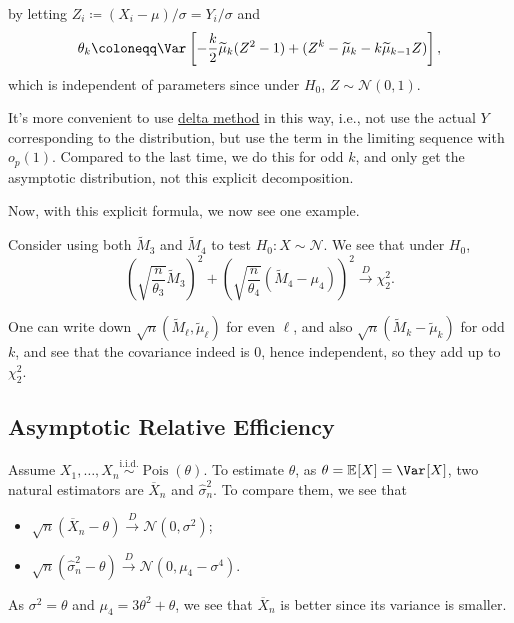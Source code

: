 by letting \(Z_i \coloneqq (X_i - \mu) / \sigma = Y_i / \sigma \) and
\[
	\theta _k
	\coloneqq \Var_{}\left[-\frac{k}{2} \widetilde{\mu} _k (Z^2 - 1) + (Z^k - \widetilde{\mu} _k - k \widetilde{\mu} _{k-1} Z ) \right],
\]
which is independent of parameters since under \(H_0\), \(Z \sim \mathcal{N} (0, 1)\).

\begin{note}
	It's more convenient to use \hyperref[thm:delta-method]{delta method} in this way, i.e., not use the actual \(Y\) corresponding to the distribution, but use the term in the limiting sequence with \(o_p(1)\). Compared to the last time, we do this for odd \(k\), and only get the asymptotic distribution, not this explicit decomposition.
\end{note}

Now, with this explicit formula, we now see one example.

\begin{eg}
	Consider using both \(\widetilde{M} _3\) and \(\widetilde{M} _4\) to test \(H_0\colon X \sim \mathcal{N} \). We see that under \(H_0\),
	\[
		\left( \sqrt{\frac{n}{\theta _3}} \widetilde{M} _3 \right) ^2 + \left( \sqrt{\frac{n}{\theta _4}} (\widetilde{M} _4 - \mu _4) \right) ^2
		\overset{D}{\to} \chi _2^2 .
	\]
\end{eg}
\begin{explanation}
	One can write down \(\sqrt{n} (\widetilde{M} _\ell , \widetilde{\mu} _\ell )\) for even \(\ell \), and also \(\sqrt{n} (\widetilde{M} _k - \widetilde{\mu} _k)\) for odd \(k\), and see that the covariance indeed is \(0\), hence independent, so they add up to \(\chi _2^2\).
\end{explanation}

\subsection{Asymptotic Relative Efficiency}
Assume \(X_1, \dots , X_n \overset{\text{i.i.d.} }{\sim } \operatorname{Pois}(\theta ) \). To estimate \(\theta \), as \(\theta = \mathbb{E}_{}[X] = \Var_{}[X] \), two natural estimators are \(\overline{X} _n\) and \(\hat{\sigma} _n^2\). To compare them, we see that
\begin{itemize}
	\item \(\sqrt{n} (\overline{X} _n - \theta ) \overset{D}{\to} \mathcal{N} (0, \sigma ^2)\);
	\item \(\sqrt{n} (\hat{\sigma} _n^2 - \theta ) \overset{D}{\to} \mathcal{N} (0, \mu _4 - \sigma ^4)\).
\end{itemize}
As \(\sigma ^2 = \theta \) and \(\mu _4 = 3 \theta ^2 + \theta \), we see that \(\overline{X} _n\) is better since its variance is smaller.

